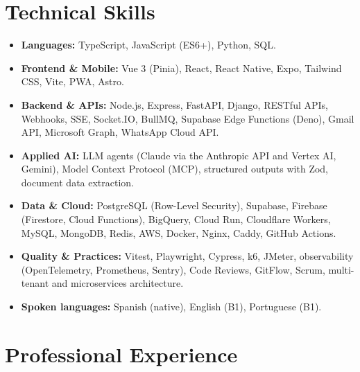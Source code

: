 \documentclass[11pt,a4paper]{article}
\begin{document}
\section*{Technical Skills}
\begin{itemize}[leftmargin=*, noitemsep]
    \item \textbf{Languages:} TypeScript, JavaScript (ES6+), Python, SQL.
    \item \textbf{Frontend \& Mobile:} Vue 3 (Pinia), React, React Native, Expo, Tailwind CSS, Vite, PWA, Astro.
    \item \textbf{Backend \& APIs:} Node.js, Express, FastAPI, Django, RESTful APIs, Webhooks, SSE, Socket.IO, BullMQ, Supabase Edge Functions (Deno), Gmail API, Microsoft Graph, WhatsApp Cloud API.
    \item \textbf{Applied AI:} LLM agents (Claude via the Anthropic API and Vertex AI, Gemini), Model Context Protocol (MCP), structured outputs with Zod, document data extraction.
    \item \textbf{Data \& Cloud:} PostgreSQL (Row-Level Security), Supabase, Firebase (Firestore, Cloud Functions), BigQuery, Cloud Run, Cloudflare Workers, MySQL, MongoDB, Redis, AWS, Docker, Nginx, Caddy, GitHub Actions.
    \item \textbf{Quality \& Practices:} Vitest, Playwright, Cypress, k6, JMeter, observability (OpenTelemetry, Prometheus, Sentry), Code Reviews, GitFlow, Scrum, multi-tenant and microservices architecture.
    \item \textbf{Spoken languages:} Spanish (native), English (B1), Portuguese (B1).
\end{itemize}

\section*{Professional Experience}
\end{document}
